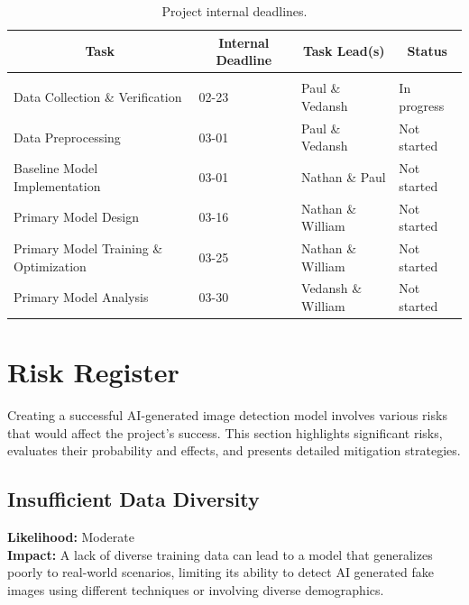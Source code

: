 \documentclass{article} %
\begin{document}
    \begin{table}[t]
    \caption{Project internal deadlines.}
    \label{plan_table}
    \begin{center}
    \begin{tabular}{llll}
    \multicolumn{1}{c}{\bf Task}            & \multicolumn{1}{c}{\bf Internal Deadline} & \multicolumn{1}{c}{\bf Task Lead(s)} & \multicolumn{1}{c}{\bf Status}
    \\ \hline \\
    Data Collection \& Verification         & 02-23                                     & Paul \& Vedansh       & In progress \\
    Data Preprocessing                      & 03-01                                     & Paul \& Vedansh       & Not started \\
    Baseline Model Implementation           & 03-01                                     & Nathan \& Paul        & Not started \\                   
    Primary Model Design                    & 03-16                                     & Nathan \& William     & Not started  \\
    Primary Model Training \& Optimization  & 03-25                                     & Nathan \& William     & Not started  \\
    Primary Model Analysis                  & 03-30                                     & Vedansh \& William    & Not started  \\
    \end{tabular}
    \end{center}
    \end{table}
    
\section{Risk Register}
\label{risk}
Creating a successful AI-generated image detection model involves various risks that would affect the project's success. This section highlights significant risks, evaluates their probability and effects, and presents detailed mitigation strategies.

\subsection{Insufficient Data Diversity}
\textbf{Likelihood:} Moderate \\
\textbf{Impact:} A lack of diverse training data can lead to a model that generalizes poorly to real-world scenarios, limiting its ability to detect AI generated fake images using different techniques or involving diverse demographics.
\end{document}
